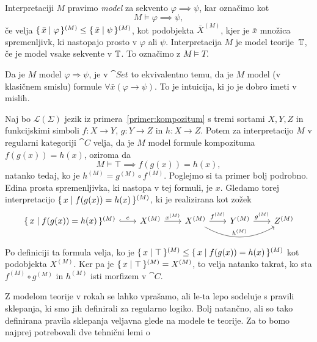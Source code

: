\documentclass[../kategoricna_logika.tex]{subfiles}
\begin{document}
\begin{definicija}
  Interpretaciji $M$ pravimo \emph{model} za sekvento
  $\varphi \implies \psi$, kar označimo kot
  $$M \models \varphi \implies \psi,$$
  če velja
  $\lbrace\,\bar{x} \mid \varphi\,\rbrace^{(M)} \leq \lbrace\,\bar{x} \mid
    \psi\,\rbrace^{(M)}$, kot podobjekta $\bar{X}^{(M)}$, kjer je $\bar{x}$
  množica spremenljivk, ki nastopajo prosto v $\varphi$ ali $\psi$.
  Interpretacija $M$ je model teorije~$\mathbb{T}$, če je model vsake sekvente
  v $\mathbb{T}$.  To označimo z $M \models T$.
\end{definicija}
\begin{opomba}
  Da je $M$ model $\varphi \Rightarrow \psi$, je v $\cat{Set}$ to
  ekvivalentno temu, da je $M$ model (v klasičnem smislu) formule
  $\forall \bar{x} (\varphi \rightarrow \psi)$. To je intuicija, ki jo
  je dobro imeti v mislih.
\end{opomba}
\begin{primer}
  Naj bo $\mathcal{L}(\Sigma)$ jezik iz primera~\ref{primer:kompozitum}
  s tremi sortami $X,Y,Z$ in funkcijskimi simboli
  $f : X \to Y$, $g : Y \to Z$ in $h : X \to Z$.  Potem za
  interpretacijo $M$ v regularni kategoriji $\cat{C}$ velja, da je $M$
  model formule kompozituma $f(g(x)) = h(x)$, oziroma da
  $$M \models \top \implies f(g(x)) = h(x),$$ 
  natanko tedaj, ko je $h^{(M)} = g^{(M)} \circ f^{(M)}$.  Poglejmo si
  ta primer bolj podrobno.  Edina prosta spremenljivka, ki nastopa v
  tej formuli, je $x$. Gledamo torej interpretacijo
  $\lbrace\,x  \mid  f(g(x)) = h(x)\,\rbrace^{(M)}$, ki je realizirana kot
  zožek
  \begin{equation*}
    \begin{tikzcd}[column sep=2em]
      \set{x  \mid  f(g(x)) = h(x)}^{(M)} \ar[r, hook, "e"] &
      X^{(M)} \ar[r, "x^{(M)}"] & X^{(M)} \ar[r, "f^{(M)}"] \ar[rr,
      bend right, "h^{(M)}"] & Y^{(M)} \ar[r, "g^{(M)}"] & Z^{(M)}
    \end{tikzcd}
  \end{equation*}
  Po definiciji ta formula velja, ko je
  $\lbrace\,x  \mid  \top\,\rbrace^{(M)} \leq \lbrace\,x  \mid  f(g(x)) =
    h(x)\,\rbrace^{(M)}$ kot podobjekta $X^{(M)}$.  Ker pa je
  $\lbrace\,x  \mid  \top\,\rbrace^{(M)} = X^{(M)}$, to velja natanko
  takrat, ko sta $f^{(M)} \circ g^{(M)}$ in $h^{(M)}$ isti morfizem v
  $\cat{C}$.
\end{primer}
Z modelom teorije v rokah se lahko vprašamo, ali le-ta lepo sodeluje s
pravili sklepanja, ki smo jih definirali za regularno logiko.  Bolj
natančno, ali so tako definirana pravila sklepanja veljavna glede na
modele te teorije.  Za to bomo najprej potrebovali dve tehnični lemi o
\end{document}
